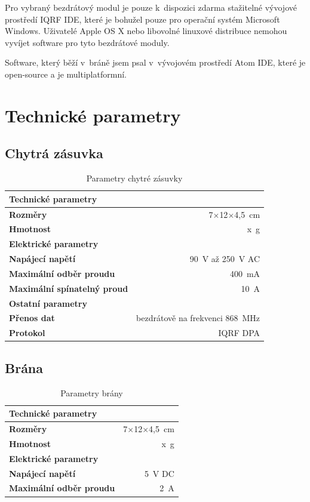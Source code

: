 \documentclass[12pt,a4paper,oneside]{article}
\begin{document}
Pro vybraný bezdrátový modul je pouze k~dispozici zdarma stažitelné vývojové prostředí IQRF IDE, které je bohužel pouze pro operační systém Microsoft Windows. Uživatelé Apple OS X nebo libovolné linuxové distribuce nemohou vyvíjet software pro tyto bezdrátové moduly.

Software, který běží v~bráně jsem psal v~vývojovém prostředí Atom IDE, které je open-source a je multiplatformní.

\newpage

\section{Technické parametry}

\subsection{Chytrá zásuvka}

\begin{table}[H]
	\centering
	\begin{tabular}{lr}
		\hline 
		\textbf{Technické parametry} & ~ \\ 
		\hline 
		\hline 
		\textbf{Rozměry} & 7$\times$12$\times$4,5~cm \\ 
		\textbf{Hmotnost} & x~g \\ 
		\hline
		\textbf{Elektrické parametry} \\ 
		\hline 
		\hline 
		\textbf{Napájecí napětí} & 90~V až 250~V AC \\ 
		\textbf{Maximální odběr proudu} & 400~mA \\ 
		\textbf{Maximální spínatelný proud} & 10~A \\ 
		\hline 
		\textbf{Ostatní parametry} \\ 
		\hline 
		\hline 
		\textbf{Přenos dat} & bezdrátově na frekvenci 868~MHz \\ 
		\textbf{Protokol} & IQRF DPA \\ 
	\end{tabular}
	\caption{Parametry chytré zásuvky}\label{table:parametry/chytra-zasuvka}
\end{table}

\subsection{Brána}

\begin{table}[H]
	\centering
	\begin{tabular}{lr}
		\hline 
		\textbf{Technické parametry} & ~ \\ 
		\hline 
		\hline 
		\textbf{Rozměry} & 7$\times$12$\times$4,5~cm \\ 
		\textbf{Hmotnost} & x~g \\ 
		\hline
		\textbf{Elektrické parametry} \\ 
		\hline 
		\hline 
		\textbf{Napájecí napětí} & 5~V DC \\
		\textbf{Maximální odběr proudu} & 2~A \\
	\end{tabular}
	\caption{Parametry brány}\label{table:parametry/zbrana}
\end{table}
\end{document}
